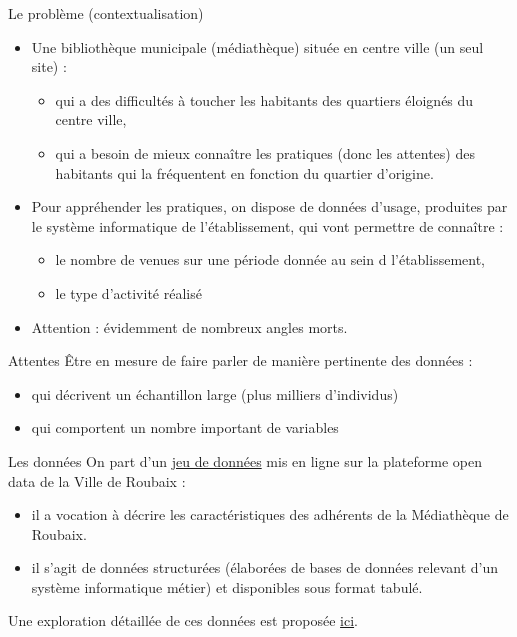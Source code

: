 \documentclass{beamer}
\begin{document}
\begin{frame}{Le problème (contextualisation)}
	\begin{itemize}
    	\item Une bibliothèque municipale (médiathèque) située en centre ville (un seul site) :
    	\begin{itemize}
    		\item qui a des difficultés à toucher les habitants des quartiers éloignés du centre ville,
    		\item qui a besoin de mieux connaître les pratiques (donc les attentes) des habitants qui la fréquentent en fonction du quartier d’origine.
    	\end{itemize}
    	\item Pour appréhender les pratiques, on dispose de données d’usage, produites par le système informatique de l’établissement, qui vont permettre de connaître :
    	\begin{itemize}
    		\item le nombre de venues sur une période donnée au sein d l’établissement,
    		\item le type d’activité réalisé
    	\end{itemize}
    	\item Attention : évidemment de nombreux angles morts.
	\end{itemize}
\end{frame}

\begin{frame}{Attentes}
	Être en mesure de faire parler de manière pertinente des données :
	\begin{itemize}
		\item qui décrivent un échantillon large (plus milliers d’individus)
		\item qui comportent un nombre important de variables
	\end{itemize}
\end{frame}

\begin{frame}{Les données}
	On part d'un \href{https://opendata.roubaix.fr/explore/dataset/caracteristiques_adherents_2018}{jeu de données} mis en ligne sur la plateforme open data de la Ville de Roubaix :
	\begin{itemize}
		\item il a vocation à décrire les caractéristiques des adhérents de la Médiathèque de Roubaix.
		\item il s'agit de données structurées (élaborées de bases de données relevant d'un système informatique métier) et disponibles sous format tabulé.
	\end{itemize}
	Une exploration détaillée de ces données est proposée \href{https://opendata.roubaix.fr/explore/dataset/caracteristiques_adherents_2018}{ici}.
\end{frame}
\end{document}
